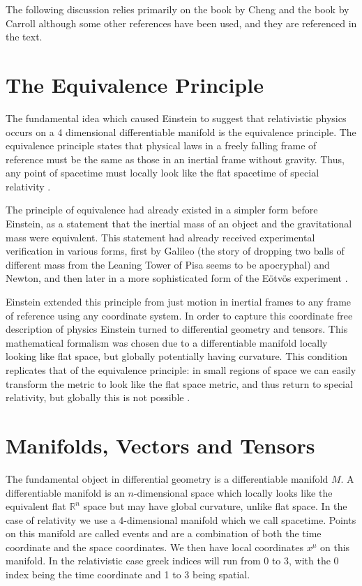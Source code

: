
The following discussion relies primarily on the book by Cheng \cite{cheng} and the book by Carroll \cite{carroll} although some other references have been used, and they are referenced in the text.

\section{The Equivalence Principle}

The fundamental idea which caused Einstein to suggest that relativistic physics occurs on a 4 dimensional differentiable manifold is the equivalence principle. The equivalence principle states that physical laws in a freely falling frame of reference must be the same as those in an inertial frame without gravity. Thus, any point of spacetime must locally look like the flat spacetime of special relativity \cite{cheng, carroll}. 

The principle of equivalence had already existed in a simpler form before Einstein, as a statement that the inertial mass of an object and the gravitational mass were equivalent. This statement had already received experimental verification in various forms, first by Galileo (the story of dropping two balls of different mass from the Leaning Tower of Pisa seems to be apocryphal) and Newton, and then later in a more sophisticated form of the E{\" o}tv{\" o}s experiment \cite{cheng}. 

Einstein extended this principle from just motion in inertial frames to any frame of reference using any coordinate system. In order to capture this coordinate free description of physics Einstein turned to differential geometry and tensors. This mathematical formalism was chosen due to a differentiable manifold locally looking like flat space, but globally potentially having curvature. This condition replicates that of the equivalence principle: in small regions of space we can easily transform the metric to look like the flat space metric, and thus return to special relativity, but globally this is not possible \cite{cheng, carroll, szekeres}. 

\section{Manifolds, Vectors and Tensors}

The fundamental object in differential geometry is a differentiable manifold \(M\). A differentiable manifold is an \(n\)-dimensional space which locally looks like the equivalent flat \(\mathbb{R}^n\) space but may have global curvature, unlike flat space. In the case of relativity we use a 4-dimensional manifold which we call spacetime. Points on this manifold are called events and are a combination of both the time coordinate and the space coordinates. We then have local coordinates \(x^{\mu}\) on this manifold. In the relativistic case greek indices will run from 0 to 3, with the 0 index being the time coordinate and 1 to 3 being spatial. 

